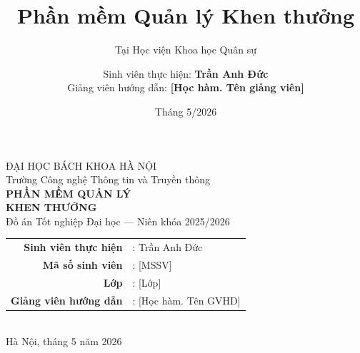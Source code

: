 \documentclass[aspectratio=43,xcolor=table]{beamer}
\title{Phần mềm Quản lý Khen thưởng}
\subtitle{Tại Học viện Khoa học Quân sự}
\author[Trần Anh Đức]{Sinh viên thực hiện: \textbf{Trần Anh Đức}\\Giảng viên hướng dẫn: \textbf{[Học hàm. Tên giảng viên]}}
\institute[ĐHBKHN]{Trường Công nghệ Thông tin và Truyền thông --- Đại học Bách khoa Hà Nội}
\date{Tháng 5/2026}
\begin{document}
{
\begin{frame}[plain]
  \begin{center}
    \vspace{0.5cm}
    {\large \textcolor{hustdark}{ĐẠI HỌC BÁCH KHOA HÀ NỘI}}\\
    {\small \textcolor{textmuted}{Trường Công nghệ Thông tin và Truyền thông}}\\[1.2cm]

    {\Huge \textcolor{hustred}{\textbf{PHẦN MỀM QUẢN LÝ}}}\\[0.3cm]
    {\Huge \textcolor{hustred}{\textbf{KHEN THƯỞNG}}}\\[0.5cm]

    {\large Đồ án Tốt nghiệp Đại học --- Niên khóa 2025/2026}\\[1.5cm]

    \begin{tabular}{rl}
      \textbf{Sinh viên thực hiện} & : Trần Anh Đức \\
      \textbf{Mã số sinh viên} & : [MSSV] \\
      \textbf{Lớp} & : [Lớp] \\
      \textbf{Giảng viên hướng dẫn} & : [Học hàm. Tên GVHD] \\
    \end{tabular}\\[1cm]

    {\small \textcolor{textmuted}{Hà Nội, tháng 5 năm 2026}}
  \end{center}
\end{frame}
}
\end{document}
